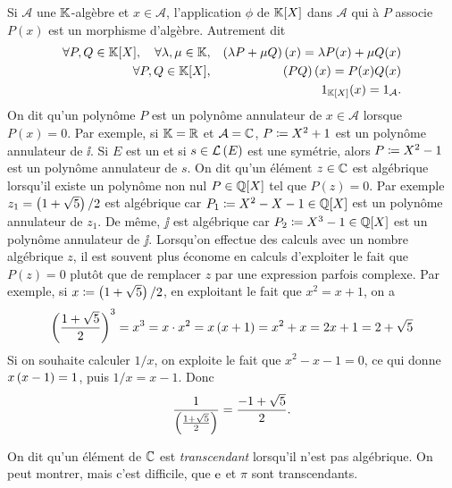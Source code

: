 \documentclass{magnolia}
\begin{document}
\begin{remarques}
\remarque Si $\mathcal{A}$ une $\mathbb{K}$-algèbre et $x\in\mathcal{A}$,
  l'application $\phi$ de $\polyK$ dans $\mathcal{A}$ qui à $P$ associe
  $P(x)$ est un morphisme d'algèbre. Autrement dit
  \begin{eqnarray*}
  \forall P,Q\in\polyK \qsep \forall \lambda,\mu\in\K, & &
    \p{\lambda P+\mu Q}(x)=\lambda P(x)+\mu Q(x)\\
  \forall P,Q\in\polyK, & &
    \p{PQ}(x)=P(x)Q(x)\\
  & & 1_{\polyK}(x)=1_{\mathcal{A}}.
  \end{eqnarray*}
\remarque On dit qu'un polynôme $P$ est un polynôme annulateur de
  $x\in\mathcal{A}$ lorsque $P(x)=0$. Par exemple, si $\mathbb{K}=\mathbb{R}$ et
  $\mathcal{A}=\mathbb{C}$, $P\coloneqq X^2+1$ est un polynôme annulateur de $\ii$. Si $E$
  est un \Kev et si $s\in\mathcal{L}\left(E\right)$ est une symétrie, alors $P\coloneqq X^2-1$ est un
  polynôme annulateur de $s$.
\remarque On dit qu'un élément $z\in\mathbb{C}$ est algébrique lorsqu'il existe un polynôme
  non nul $P\in\polyQ$ tel que $P(z)=0$. Par exemple $z_1=\left(1+\sqrt{5}\right)/2$
  est algébrique car $P_1\defeq X^2-X-1\in\polyQ$
  est un polynôme annulateur de $z_1$. De même,
  $\jj$ est algébrique car $P_2\defeq X^3-1\in\polyQ$
  est un polynôme annulateur de $\jj$. Lorsqu'on
  effectue des calculs avec un nombre algébrique $z$, il est souvent plus économe en
  calculs d'exploiter le fait que $P(z)=0$ plutôt que de remplacer $z$ par une
  expression parfois complexe. Par exemple, si $x\coloneqq\left(1+\sqrt{5}\right)/2$, en exploitant le fait que
  $x^2=x+1$, on a
  \[\left(\frac{1+\sqrt{5}}{2}\right)^3
    =x^3=x\cdot x^2=x\left(x+1\right)=x^2+x=2x+1=2+\sqrt{5}\]
  Si on souhaite calculer $1/x$, on exploite le fait que $x^2-x-1=0$, ce qui donne $x\left(x-1\right)=1$, puis $1/x=x-1$. Donc
  \[\frac{1}{\left(\frac{1+\sqrt{5}}{2}\right)}=\frac{-1+\sqrt{5}}{2}.\]

\remarque On dit qu'un élément de $\mathbb{C}$ est \emph{transcendant} lorsqu'il n'est pas
  algébrique. On peut montrer, mais c'est difficile, que ${\rm e}$ et $\pi$ sont
  transcendants.
\end{remarques}
\end{document}
